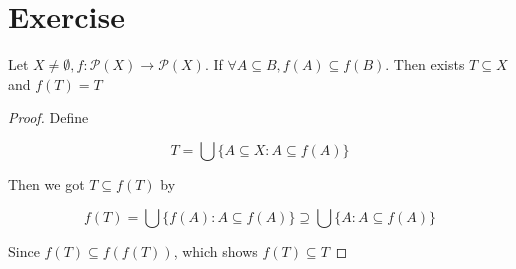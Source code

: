 \section{Exercise}

\begin{exercise}
    Let $X \ne \emptyset, f: \mathscr{P}(X) \to \mathscr{P}(X)$. If $\forall A \subseteq B, f(A) \subseteq f(B)$. Then
    exists $T \subseteq X$ and $f(T) = T$
\end{exercise}

\begin{proof}
   Define 

   \[
        T = \bigcup \{ A \subseteq X: A \subseteq f(A) \}
   \]

   Then we got $T \subseteq f(T)$ by

   \[
    f(T) = \bigcup \{ f(A): A \subseteq f(A) \} \supseteq  \bigcup \{ A: A \subseteq f(A) \}
   \]

   Since $f(T) \subseteq f(f(T))$, which shows $f(T) \subseteq T$

\end{proof}